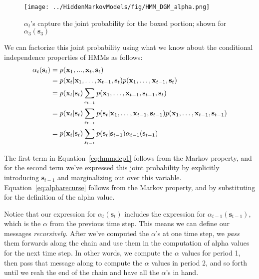 \begin{figure}[h!]
    \centering
    \texttt{[image: ../HiddenMarkovModels/fig/HMM\_DGM\_alpha.png]}
    \caption{$\alpha_t$'s capture the joint probability for the boxed portion; shown for $\alpha_3(\mathbf{s}_3)$}
    \label{fig:HMM-DGM-alpha}
\end{figure}




We can factorize this joint probability using what we know about the conditional independence properties of HMMs as follows:
%
\begin{align} 
  \alpha_t(\textbf{s}_t) &= p(\textbf{x}_1, ..., \textbf{x}_t, \textbf{s}_t) \notag \\
                         &=p(\textbf{x}_t|\textbf{x}_1,\ldots,\textbf{x}_{t-1},\textbf{s}_t)p(\textbf{x}_1,\ldots,\textbf{x}_{t-1},\textbf{s}_t)\notag \\
                         &=p(\textbf{x}_t|\textbf{s}_t)\sum_{s_{t-1}}p(\textbf{x}_1,\ldots,\textbf{x}_{t-1},\textbf{s}_{t-1},\textbf{s}_t) \label{eq:hmmdcp1} \\
                         &=p(\textbf{x}_t|\textbf{s}_t)\sum_{s_{t-1}}p(\textbf{s}_t|\textbf{x}_1,\ldots,\textbf{x}_{t-1},\textbf{s}_{t-1})p(\textbf{x}_1,\ldots,\textbf{x}_{t-1},\textbf{s}_{t-1})\\
  &= p(\textbf{x}_t | \textbf{s}_t) \sum_{s_{t-1}} p(\textbf{s}_t | \textbf{s}_{t-1}) \alpha_{t-1}(\textbf{s}_{t-1})\label{eq:alpharecurse}
\end{align}

The first term in Equation~\eqref{eq:hmmdcp1} follows from the Markov property, and for the second term we've expressed this joint probability by explicitly introducing $\textbf{s}_{t-1}$ and marginalizing out over this variable. Equation~\ref{eq:alpharecurse} follows from the Markov property, and by
substituting for the definition of the alpha value. 



Notice that our expression for $\alpha_t(\textbf{s}_t)$ includes the expression for $\alpha_{t-1}(\textbf{s}_{t-1})$, which is the $\alpha$ from the previous time step.
This means we can define our messages \textit{recursively}.
%
After we've computed the $\alpha$'s at one time step,
we \textit{pass} them forwards along the chain and use them in the computation of
alpha values for the next time step.
%
In other words, we compute the $\alpha$ values for period 1, then pass that message along to compute the $\alpha$ values  in period 2, and so forth until we reah the end of the chain and have all the $\alpha$'s in hand.


